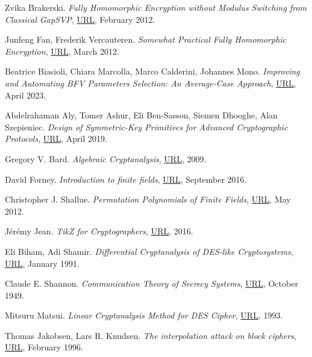 \documentclass{Resources/UoBLab1}
\theoremstyle{definition}
\begin{document}
\begin{thebibliography}{10}
 Zvika Brakerski. \textit{Fully Homomorphic Encryption without Modulus Switching from Classical GapSVP}, \href{https://eprint.iacr.org/2012/078.pdf}{URL}, February 2012.

 Junfeng Fan, Frederik Vercauteren. \textit{Somewhat Practical Fully Homomorphic Encryption}, \href{https://eprint.iacr.org/2012/144.pdf}{URL}, March 2012.

 Beatrice Biasioli, Chiara Marcolla, Marco Calderini, Johannes Mono. \textit{Improving and Automating BFV Parameters Selection: An Average-Case Approach}, \href{https://eprint.iacr.org/2023/600.pdf}{URL}, April 2023.

 Abdelrahaman Aly, Tomer Ashur, Eli Ben-Sasson, Siemen Dhooghe, Alan Szepieniec. \textit{Design of Symmetric-Key Primitives for Advanced Cryptographic Protocols}, \href{https://eprint.iacr.org/2019/426.pdf}{URL}, April 2019.

 Gregory V. Bard. \textit{Algebraic Cryptanalysis}, \href{https://link.springer.com/book/10.1007/978-0-387-88757-9}{URL}, 2009.

 David Forney. \textit{Introduction to finite fields}, \href{http://web.stanford.edu/~marykw/classes/CS250_W19/readings/Forney_Introduction_to_Finite_Fields.pdf}{URL}, September 2016.

 Christopher J. Shallue. \textit{Permutation Polynomials of Finite Fields}, \href{https://arxiv.org/pdf/1211.6044.pdf}{URL}, May 2012.

 J\'er\'emy Jean. \textit{TikZ for Cryptographers}, \href{https://www.iacr.org/authors/tikz/}{URL}, 2016.

 Eli Biham, Adi Shamir. \textit{Differential Cryptanalysis of DES-like Cryptosystems}, \href{https://link.springer.com/content/pdf/10.1007/3-540-38424-3_1.pdf}{URL}, January 1991.

 Claude E. Shannon. \textit{Communication Theory of Secrecy Systems}, \href{https://pages.cs.wisc.edu/~rist/642-spring-2014/shannon-secrecy.pdf}{URL}, October 1949.

 Mitsuru Matsui. \textit{Linear Cryptanalysis Method for DES Cipher}, \href{https://link.springer.com/content/pdf/10.1007/3-540-48285-7_33.pdf}{URL}, 1993.

 Thomas Jakobsen, Lars R. Knudsen. \textit{The interpolation attack on block ciphers}, \href{https://link.springer.com/chapter/10.1007/BFb0052332}{URL}, February 1996.


\end{thebibliography}
\end{document}
